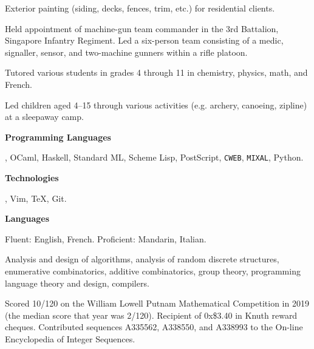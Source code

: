\smallskip
Exterior painting (siding, decks, fences, trim, etc.) for residential clients.
\medbreak

\smallskip
Held appointment of machine-gun team commander in the 3rd Battalion, Singapore Infantry Regiment.
Led a six-person team consisting of a medic, signaller, sensor, and two-machine gunners within a rifle platoon.
\medbreak

\smallskip
Tutored various students in grades 4 through 11 in chemistry, physics, math, and French.
\medbreak

\smallskip
Led children aged 4--15 through various activities (e.g. archery, canoeing, zipline) at a sleepaway camp.
\medbreak


{\bf Programming Languages}\par
\CEE, OCaml, Haskell, Standard ML, Scheme Lisp, PostScript, {\tt CWEB}, {\tt MIXAL}, Python.
\medbreak

{\bf Technologies}\par
\UNIX, Vim, \TeX, Git.
\medbreak

{\bf Languages}\par
Fluent: English, French. Proficient: Mandarin, Italian.
\medbreak


Analysis and design of algorithms, analysis of random discrete structures, enumerative combinatorics,
additive combinatorics, group theory,
programming language theory and design, compilers.


\parindent=10pt
\thing Scored 10/120 on the William Lowell Putnam Mathematical Competition in 2019
(the median score that year was 2/120).
\smallskip
\thing Recipient of 0x\$3.40 in Knuth reward cheques.
\smallskip
\thing Contributed sequences A335562, A338550, and A338993 to the On-line Encyclopedia of Integer Sequences.
\medbreak

\rightline{\eightrm \datethis}

\filbreak

\bye


